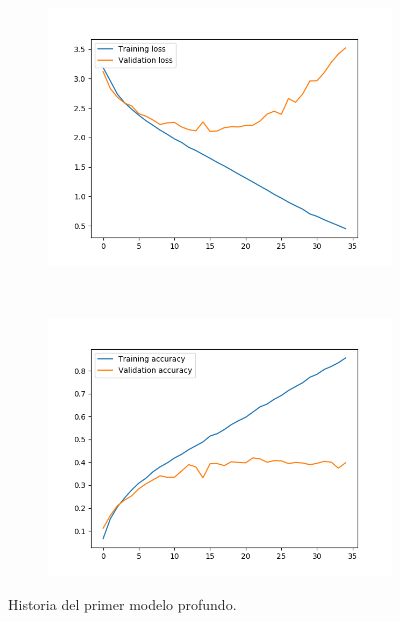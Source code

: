 \documentclass[11pt,a4paper]{article}
\begin{document}
\begin{figure}[H]
  \centering
  \begin{subfigure}{.5\textwidth}
    \centering
    \includegraphics[scale=0.4]{img/deep1-nodrop-loss.png}
    \label{fig:deep1-nodrop-loss}
  \end{subfigure}%
  ~ \quad
  \begin{subfigure}{.5\textwidth}
    \centering
    \includegraphics[scale=0.4]{img/deep1-nodrop-acc.png}
    \label{fig:deep1-nodrop-acc}
  \end{subfigure}
  \caption{Historia del primer modelo profundo.}
  \label{fig:history-deep1-nodrop}
\end{figure}
\end{document}
